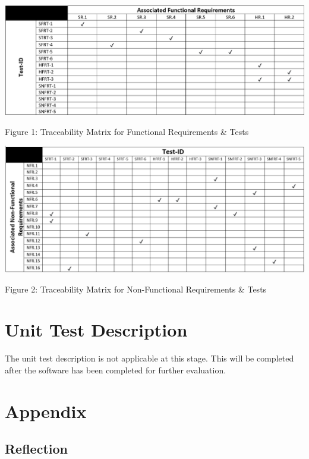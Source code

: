 \documentclass[12pt, titlepage]{article}
\begin{document}
\begin{center}
\includegraphics[width=16cm]{images/Traceability Matrix Functional Requirements.png}
\end{center}
\caption{Figure 1: Traceability Matrix for Functional Requirements \& Tests}

\begin{center}
\includegraphics[width=16cm]{images/Traceability Matrix Non-Functional Requirements.png}
\end{center}
\caption{Figure 2: Traceability Matrix for Non-Functional Requirements \& Tests}


\section{Unit Test Description}
The unit test description is not applicable at this stage. This will be completed after the software has been completed for further evaluation.

\section{Appendix}

\subsection{Reflection}

\subsubsection{}
\end{document}
